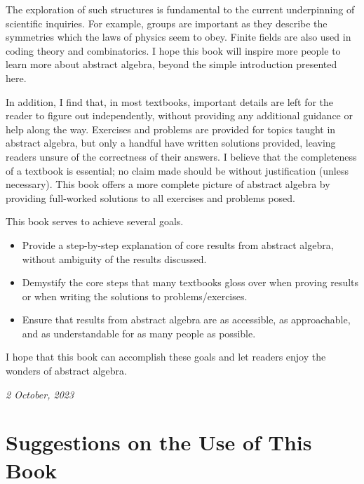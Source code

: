 The exploration of such structures is fundamental to the current underpinning of scientific inquiries. For example, groups are important as they describe the symmetries which the laws of physics seem to obey. Finite fields are also used in coding theory and combinatorics. I hope this book will inspire more people to learn more about abstract algebra, beyond the simple introduction presented here.

In addition, I find that, in most textbooks, important details are left for the reader to figure out independently, without providing any additional guidance or help along the way. Exercises and problems are provided for topics taught in abstract algebra, but only a handful have written solutions provided, leaving readers unsure of the correctness of their answers. I believe that the completeness of a textbook is essential; no claim made should be without justification (unless necessary). This book offers a more complete picture of abstract algebra by providing full-worked solutions to all exercises and problems posed.

This book serves to achieve several goals.
\begin{itemize}
    \item Provide a step-by-step explanation of core results from abstract algebra, without ambiguity of the results discussed.
    \item Demystify the core steps that many textbooks gloss over when proving results or when writing the solutions to problems/exercises.
    \item Ensure that results from abstract algebra are as accessible, as approachable, and as understandable for as many people as possible.
\end{itemize}
I hope that this book can accomplish these goals and let readers enjoy the wonders of abstract algebra.

\hfill{\textit{2 October, 2023}}

\chapter{Suggestions on the Use of This Book}
